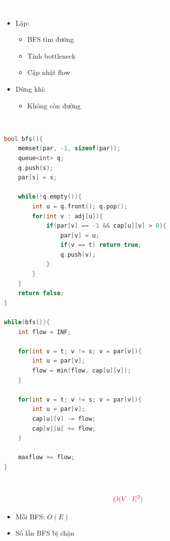 \documentclass{beamer}
\newcommand{\hlred}[1]{\textcolor{myred}{#1}}
\newcommand{\hlwhite}[1]{\textcolor{white}{#1}}
\begin{document}
\begin{frame}{\hlwhite{Thuật toán}}
\begin{itemize}
\item Lặp:
\begin{itemize}
\item BFS tìm đường
\item Tính bottleneck
\item Cập nhật flow
\end{itemize}

\item Dừng khi:
\begin{itemize}
\item Không còn đường
\end{itemize}
\end{itemize}
\end{frame}


\begin{frame}[fragile]{\hlwhite{Code (Core)}}
\begin{lstlisting}[language=C++]
bool bfs(){
    memset(par, -1, sizeof(par));
    queue<int> q;
    q.push(s);
    par[s] = s;

    while(!q.empty()){
        int u = q.front(); q.pop();
        for(int v : adj[u]){
            if(par[v] == -1 && cap[u][v] > 0){
                par[v] = u;
                if(v == t) return true;
                q.push(v);
            }
        }
    }
    return false;
}

while(bfs()){
    int flow = INF;

    for(int v = t; v != s; v = par[v]){
        int u = par[v];
        flow = min(flow, cap[u][v]);
    }

    for(int v = t; v != s; v = par[v]){
        int u = par[v];
        cap[u][v] -= flow;
        cap[v][u] += flow;
    }

    maxflow += flow;
}
\end{lstlisting}
\end{frame}


\begin{frame}{\hlwhite{Độ phức tạp}}
\begin{tcolorbox}
\centering
\[
\hlred{O(V \cdot E^2)}
\]
\end{tcolorbox}

\begin{itemize}
\item Mỗi BFS: $O(E)$
\item Số lần BFS bị chặn
\end{itemize}
\end{frame}
\end{document}
